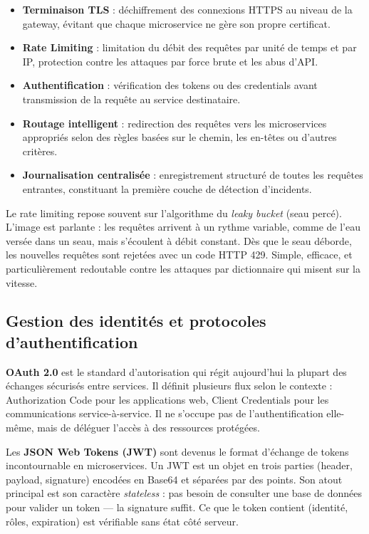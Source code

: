 \documentclass[12pt, a4paper]{report}
\begin{document}
\begin{itemize}[leftmargin=*]
  \item \textbf{Terminaison TLS} : déchiffrement des connexions HTTPS au niveau de la gateway, évitant que chaque microservice ne gère son propre certificat.
  \item \textbf{Rate Limiting} : limitation du débit des requêtes par unité de temps et par IP, protection contre les attaques par force brute et les abus d'API.
  \item \textbf{Authentification} : vérification des tokens ou des credentials avant transmission de la requête au service destinataire.
  \item \textbf{Routage intelligent} : redirection des requêtes vers les microservices appropriés selon des règles basées sur le chemin, les en-têtes ou d'autres critères.
  \item \textbf{Journalisation centralisée} : enregistrement structuré de toutes les requêtes entrantes, constituant la première couche de détection d'incidents.
\end{itemize}

Le rate limiting repose souvent sur l'algorithme du \textit{leaky bucket} (seau percé). L'image est parlante : les requêtes arrivent à un rythme variable, comme de l'eau versée dans un seau, mais s'écoulent à débit constant. Dès que le seau déborde, les nouvelles requêtes sont rejetées avec un code HTTP 429. Simple, efficace, et particulièrement redoutable contre les attaques par dictionnaire qui misent sur la vitesse.

\subsection{Gestion des identités et protocoles d'authentification}

\textbf{OAuth 2.0} est le standard d'autorisation qui régit aujourd'hui la plupart des échanges sécurisés entre services. Il définit plusieurs flux selon le contexte : Authorization Code pour les applications web, Client Credentials pour les communications service-à-service. Il ne s'occupe pas de l'authentification elle-même, mais de déléguer l'accès à des ressources protégées.

Les \textbf{JSON Web Tokens (JWT)} sont devenus le format d'échange de tokens incontournable en microservices. Un JWT est un objet en trois parties (header, payload, signature) encodées en Base64 et séparées par des points. Son atout principal est son caractère \textit{stateless} : pas besoin de consulter une base de données pour valider un token — la signature suffit. Ce que le token contient (identité, rôles, expiration) est vérifiable sans état côté serveur.
\end{document}
